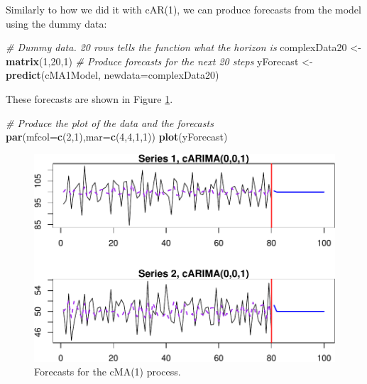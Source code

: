 \documentclass[
]{book}
\newenvironment{Shaded}{\begin{snugshade}}{\end{snugshade}}
\newcommand{\CommentTok}[1]{\textcolor[rgb]{0.56,0.35,0.01}{\textit{#1}}}
\newcommand{\DataTypeTok}[1]{\textcolor[rgb]{0.13,0.29,0.53}{#1}}
\newcommand{\DecValTok}[1]{\textcolor[rgb]{0.00,0.00,0.81}{#1}}
\newcommand{\KeywordTok}[1]{\textcolor[rgb]{0.13,0.29,0.53}{\textbf{#1}}}
\newcommand{\NormalTok}[1]{#1}
\newcommand{\StringTok}[1]{\textcolor[rgb]{0.31,0.60,0.02}{#1}}
\begin{document}
Similarly to how we did it with cAR(1), we can produce forecasts from the model using the dummy data:

\begin{Shaded}
\begin{Highlighting}[]
\CommentTok{\# Dummy data. 20 rows tells the function what the horizon is}
\NormalTok{complexData20 \textless{}{-}}\StringTok{ }\KeywordTok{matrix}\NormalTok{(}\DecValTok{1}\NormalTok{,}\DecValTok{20}\NormalTok{,}\DecValTok{1}\NormalTok{)}
\CommentTok{\# Produce forecasts for the next 20 steps}
\NormalTok{yForecast \textless{}{-}}\StringTok{ }\KeywordTok{predict}\NormalTok{(cMA1Model, }\DataTypeTok{newdata=}\NormalTok{complexData20)}
\end{Highlighting}
\end{Shaded}

These forecasts are shown in Figure \ref{fig:complexMA1Forecast}.

\begin{Shaded}
\begin{Highlighting}[]
\CommentTok{\# Produce the plot of the data and the forecasts}
\KeywordTok{par}\NormalTok{(}\DataTypeTok{mfcol=}\KeywordTok{c}\NormalTok{(}\DecValTok{2}\NormalTok{,}\DecValTok{1}\NormalTok{),}\DataTypeTok{mar=}\KeywordTok{c}\NormalTok{(}\DecValTok{4}\NormalTok{,}\DecValTok{4}\NormalTok{,}\DecValTok{1}\NormalTok{,}\DecValTok{1}\NormalTok{))}
\KeywordTok{plot}\NormalTok{(yForecast)}
\end{Highlighting}
\end{Shaded}

\begin{figure}
\centering
\includegraphics{Svetunkov---Svetunkov---Complex-Valued-Econometrics_files/figure-latex/complexMA1Forecast-1.pdf}
\caption{\label{fig:complexMA1Forecast}Forecasts for the cMA(1) process.}
\end{figure}
\end{document}
